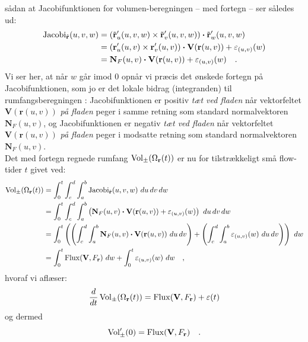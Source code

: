 \begin{bevis}
\begin{equation}
\end{equation}
sådan at Jacobifunktionen for volumen-beregningen --  med fortegn -- ser således ud:
\begin{equation}
\begin{aligned}
\operatorname{Jacobi}_{\tilde{\mathbf{r}}}(u,v,w) &= \left(\tilde{\mathbf{r}}'_{u}(u,v,w) \times \tilde{\mathbf{r}}'_{v}(u,v,w) \right) \bm{\cdot} \tilde{\mathbf{r}}'_{w}(u,v,w) \\
&= \left( \mathbf{r}'_{u}(u,v)  \times \mathbf{r}'_{v}(u,v) \right) \bm{\cdot} \mathbf{V}(\mathbf{r}(u,v)) + \varepsilon_{(u,v)}(w) \\
&= \mathbf{N}_{F}(u,v) \bm{\cdot} \mathbf{V}(\mathbf{r}(u,v)) + \varepsilon_{(u,v)}(w) \quad .
\end{aligned}
\end{equation}
Vi ser her, at når $w$ går imod $0$ opnår vi præcis det ønskede fortegn på Jacobifunktionen, som jo er det lokale bidrag (integranden) til rumfangsberegningen : Jacobifunktionen er positiv \emph{tæt ved fladen} når vektorfeltet $\mathbf{V}(\mathbf{r}(u,v))$ \emph{på fladen} peger i samme retning som standard normalvektoren $\mathbf{N}_{F}(u,v)$, og Jacobifunktionen er negativ \emph{tæt ved fladen} når vektorfeltet $\mathbf{V}(\mathbf{r}(u,v))$ \emph{på fladen} peger i modsatte retning som standard normalvektoren $\mathbf{N}_{F}(u,v)$.\\

Det med fortegn regnede rumfang $\operatorname{Vol}_{\pm}(\Omega_{\mathbf{r}}(t))$ er nu for tilstrækkeligt små flow-tider $t$  givet ved:
\begin{equation}
\begin{aligned}
\operatorname{Vol}_{\pm}(\Omega_{\mathbf{r}}(t)) &= \int_{0}^{t} \int_{c}^{d} \int_{a}^{b} \operatorname{Jacobi}_{\tilde{\mathbf{r}}}(u,v,w) \,\, du\,dv\,dw\\
&= \int_{0}^{t} \int_{c}^{d} \int_{a}^{b}\left( \mathbf{N}_{F}(u,v) \bm{\cdot} \mathbf{V}(\mathbf{r}(u,v)) + \varepsilon_{(u,v)}(w) \right)  \,\, du\,dv\,dw\\
&= \int_{0}^{t}\left( \left( \int_{c}^{d} \int_{a}^{b} \mathbf{N}_{F}(u,v) \bm{\cdot} \mathbf{V}(\mathbf{r}(u,v)) \,\, du \, dv \right) + \left( \int_{c}^{d} \int_{a}^{b} \varepsilon_{(u,v)}(w) \,\, du \, dv \right) \right) \,\, dw\\
&= \int_{0}^{t} \operatorname{Flux}(\mathbf{V}, F_{\mathbf{r}})\,\,dw + \int_{0}^{t} \varepsilon_{(u,v)}(w)  \,\,dw \quad,
\end{aligned}
\end{equation}
hvoraf vi aflæser:
\begin{equation}
\frac{d}{dt}\operatorname{Vol}_{\pm}(\Omega_{\mathbf{r}}(t)) = \operatorname{Flux}(\mathbf{V}, F_{\mathbf{r}}) + \varepsilon(t)
\end{equation}
og dermed
\begin{equation}
\operatorname{Vol}_{\pm}'(0) = \operatorname{Flux}(\mathbf{V}, F_{\mathbf{r}}) \quad .
\end{equation}
\end{bevis}









